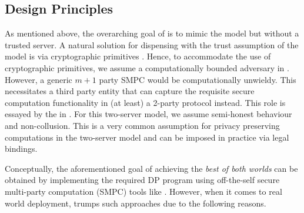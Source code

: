 \subsection{\system Design Principles}\label{sec:design}
 As mentioned above, the overarching goal of \system is to mimic the \cdp model but without a trusted server. A natural solution for dispensing with the trust assumption of the \cdp model is via cryptographic primitives \cite{Prochlo,mixnets,amplification,Shi,Shi2,kamara,Rastogi,DworkOurData,BeimelSFE+DP}. Hence, to accommodate the use of cryptographic primitives, we assume a computationally bounded adversary in \system. However, a generic $m+1$ party SMPC would be computationally unwieldy. This necessitates a third party entity that can capture the requisite secure computation functionality in (at least) a 2-party protocol instead. %
This role is essayed by the \CSP in \system. For this two-server model, we assume semi-honest behaviour and non-collusion. This is a very common assumption for privacy preserving computations in the two-server model \cite{Boneh1,Boneh2,Ridge2,Matrix2,secureML,LReg,Ver} and can be imposed in practice via legal bindings.

Conceptually, the aforementioned goal of achieving the \textit{best of both worlds} can be obtained by implementing the required DP program using off-the-self secure multi-party computation (SMPC) tools like \cite{EMP,MPCtools,ScaleMAMBA,ABY}. %
However, when it comes to real world deployment, \system trumps such approaches due to the following reasons.
 

